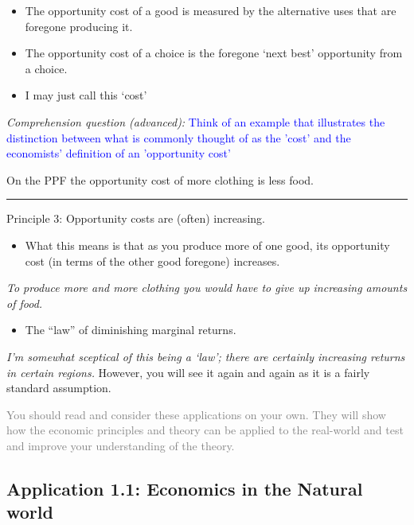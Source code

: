 \documentclass[]{article}
\providecommand{\tightlist}{%
  \setlength{\itemsep}{0pt}\setlength{\parskip}{0pt}}
\begin{document}
\begin{itemize}
\tightlist
\item
  The opportunity cost of a good is measured by the alternative uses that are foregone producing it.
\item
  The opportunity cost of a choice is the foregone `next best' opportunity from a choice.
\item
  I may just call this `cost'
\end{itemize}

\emph{Comprehension question (advanced):} \textcolor{blue}{Think of an example that illustrates the distinction between what is commonly thought of as the  'cost' and the economists' definition of an 'opportunity cost'}

On the PPF the opportunity cost of more clothing is less food.\\

\begin{center}\rule{0.5\linewidth}{\linethickness}\end{center}

Principle 3: Opportunity costs are (often) increasing.

\begin{itemize}
\tightlist
\item
  What this means is that as you produce more of one good, its opportunity cost (in terms of the other good foregone) increases.
\end{itemize}

\emph{To produce more and more clothing you would have to give up increasing amounts of food.}

\begin{itemize}
\tightlist
\item
  The ``law'' of diminishing marginal returns.
\end{itemize}

\emph{I'm somewhat sceptical of this being a `law'; there are certainly increasing returns in certain regions.} However, you will see it again and again as it is a fairly standard assumption.

\textcolor{gray}{You should read and consider these applications on your own. They will show how the economic principles and theory can be applied to the real-world and test and improve your understanding of the theory.}

\hypertarget{application-1.1-economics-in-the-natural-world}{%
\subsection{Application 1.1: Economics in the Natural world}\label{application-1.1-economics-in-the-natural-world}}
\end{document}
